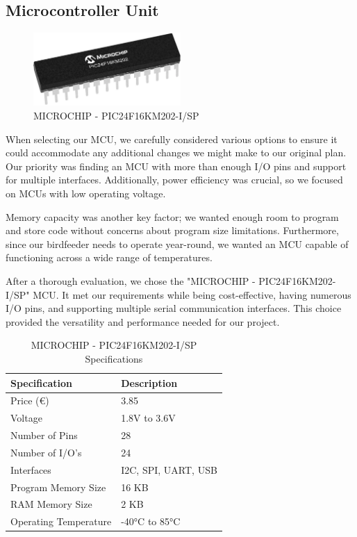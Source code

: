\documentclass[12pt,a4paper]{article}
\begin{document}
\subsection{Microcontroller Unit}

\begin{figure}[h]
    \centering
    \includegraphics[width=0.5\textwidth]{images/MCU.png}
    \caption{MICROCHIP - PIC24F16KM202-I/SP \cite{mcu}}
\end{figure}

When selecting our MCU, we carefully considered various options to ensure it could accommodate any additional changes we might make to our original plan. Our priority was finding an MCU with more than enough I/O pins and support for multiple interfaces. Additionally, power efficiency was crucial, so we focused on MCUs with low operating voltage. 

Memory capacity was another key factor; we wanted enough room to program and store code without concerns about program size limitations. Furthermore, since our birdfeeder needs to operate year-round, we wanted an MCU capable of functioning across a wide range of temperatures. 

After a thorough evaluation, we chose the "MICROCHIP - PIC24F16KM202-I/SP" MCU. It met our requirements while being cost-effective, having numerous I/O pins, and supporting multiple serial communication interfaces. This choice provided the versatility and performance needed for our project. 

\begin{table}[h]
    \centering
    \begin{tabular}{|l|l|}
    \hline
    \textbf{Specification} & \textbf{Description} \\ \hline
    Price (€)              & 3.85                 \\ \hline
    Voltage                & 1.8V to 3.6V         \\ \hline
    Number of Pins         & 28                   \\ \hline
    Number of I/O's        & 24                   \\ \hline
    Interfaces             & I2C, SPI, UART, USB  \\ \hline
    Program Memory Size    & 16 KB                \\ \hline
    RAM Memory Size        & 2 KB                 \\ \hline
    Operating Temperature  & -40°C to 85°C        \\ \hline
    \end{tabular}
    \caption{MICROCHIP - PIC24F16KM202-I/SP Specifications}
    \label{tab:microchip_specs}
    \end{table}
\end{document}
